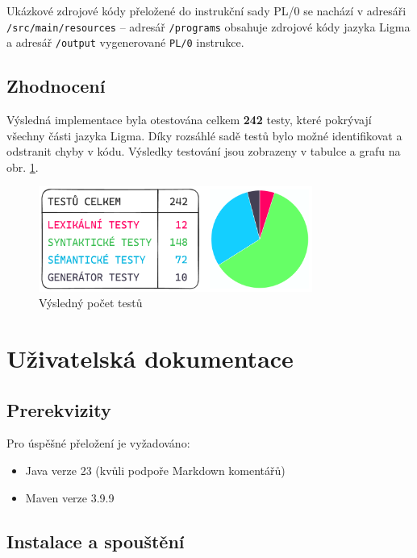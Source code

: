 \documentclass[czech, oth, kiv, he, iso690numb, viewonly]{fasthesis}
\begin{document}
    Ukázkové zdrojové kódy přeložené do instrukční sady PL/0 se nachází v adresáři \texttt{/src/main/resources} –
    adresář \texttt{/programs} obsahuje zdrojové kódy jazyka Ligma a adresář \texttt{/output} vygenerované \texttt{PL/0} instrukce.

    \section{Zhodnocení}

    Výsledná implementace byla otestována celkem \textbf{242} testy, které pokrývají všechny části jazyka Ligma.
    Díky rozsáhlé sadě testů bylo možné identifikovat a odstranit chyby v kódu.
    Výsledky testování jsou zobrazeny v tabulce a grafu na obr. \ref{fig:tests}.

    \begin{figure}[ht]
        \centering
        \includegraphics[width=0.8\textwidth]{images/testy.pdf}
        \caption{Výsledný počet testů}
        \label{fig:tests}
    \end{figure}

    \chapter{Uživatelská dokumentace}

    \section{Prerekvizity}

    Pro úspěšné přeložení je vyžadováno:
    \begin{itemize}
        \item Java verze 23 (kvůli podpoře Markdown komentářů)
        \item Maven verze 3.9.9
    \end{itemize}

    \section{Instalace a spouštění}
\end{document}

